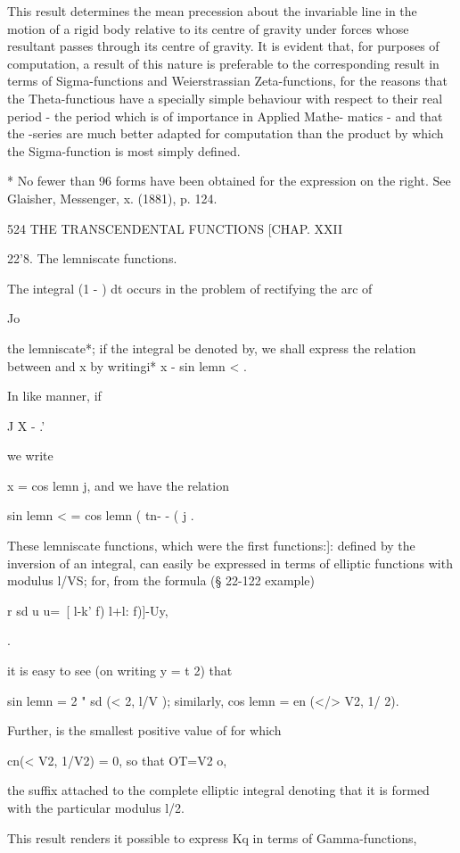 This result determines the mean precession about the invariable line
in the motion of a rigid body relative to its centre of gravity under
forces whose resultant passes through its centre of gravity. It is
evident that, for purposes of computation, a result of this nature is
preferable to the corresponding result in terms of Sigma-functions and
Weierstrassian Zeta-functions, for the reasons that the
Theta-functious have a specially simple behaviour with respect to
their real period - the period which is of importance in Applied
Mathe- matics - and that the -series are much better adapted for
computation than the product by which the Sigma-function is most
simply defined.

* No fewer than 96 forms have been obtained for the expression on the
right. See Glaisher, Messenger, x. (1881), p. 124.

524 THE TRANSCENDENTAL FUNCTIONS [CHAP. XXII

22'8. The lemniscate functions.

The integral (1 - ) dt occurs in the problem of rectifying the arc of

Jo

the lemniscate*; if the integral be denoted by, we shall express the
relation between and x by writingi* x - sin lemn < .

In like manner, if

J X - .'

we write

x = cos lemn j, and we have the relation

sin lemn < = cos lemn ( tn- - ( j .

These lemniscate functions, which were the first functions:]: defined
by the inversion of an integral, can easily be expressed in terms of
elliptic functions with modulus l/VS; for, from the formula (§ 22-122
example)

r sd u u=\ [ l-k' f) l+l: f)]-Uy,

.

it is easy to see (on writing y = t \/2) that

sin lemn = 2 " sd (< \/2, l/V ); similarly, cos lemn = en (</> V2, 1/
2).

Further, is the smallest positive value of for which

cn(< V2, 1/V2) = 0, so that OT=V2 o,

the suffix attached to the complete elliptic integral denoting that it
is formed with the particular modulus l/\/2.

This result renders it possible to express Kq in terms of
Gamma-functions,

